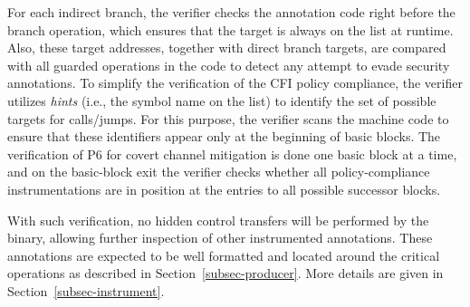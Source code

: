 For each indirect branch, the verifier checks the annotation code \DIFdelbegin {}\DIFdelend right before the branch operation, which ensures that the target is always on the list at runtime. Also, these target addresses, together with direct branch targets, are compared with all guarded operations in the code to detect any attempt to evade security annotations. To simplify the verification of the CFI policy compliance, the verifier utilizes \textit{hints} (i.e., the symbol  name on the list) to identify the set of possible targets for calls/jumps. For this purpose, the verifier scans the machine code  to ensure that these identifiers appear only at the beginning of basic blocks. The verification of P6 for covert channel mitigation is done one basic block at a time, and on the basic-block exit the verifier checks whether all policy-compliance instrumentations are in position at the entries to all possible successor blocks.
\DIFdelbegin %


\DIFdelend With such verification, no hidden control transfers will be performed by the binary, allowing further inspection of other instrumented annotations. These annotations are expected to be well formatted and located around the critical operations as described in Section~\ref{subsec-producer}. %
More details are given in Section~\ref{subsec-instrument}\DIFdelbegin {}\DIFdelend .




